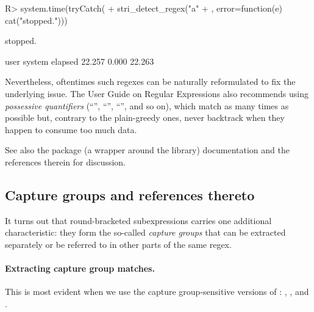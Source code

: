 \documentclass[nojss]{jss}
\begin{document}
\begin{Schunk}
\begin{Sinput}
R> system.time(tryCatch({
+      stri_detect_regex("a" %s*% 1000 %s+% "c", "(a+)+b", time_limit=1e5)
+  }, error=function(e) cat("stopped.")))
\end{Sinput}
\begin{Soutput}
stopped.
\end{Soutput}
\begin{Soutput}
   user  system elapsed
 22.257   0.000  22.263
\end{Soutput}
\end{Schunk}


Nevertheless, oftentimes such regexes can be naturally
reformulated to  fix the underlying issue.
The  User Guide on Regular Expressions also recommends using
\textit{possessive quantifiers} (``'', ``\code{*+}'', ``\code{++}'', and so on),
which match as many times as possible but, contrary to
the plain-greedy ones, never backtrack when they happen to consume too much data.

See also the  package (a wrapper around the  library)
documentation and the references therein for discussion.





\subsection{Capture groups and references thereto}\label{Sec:Capturing}

It turns out that round-bracketed subexpressions carries one additional
characteristic: they form the so-called \textit{capture groups} that can
be extracted separately or be referred to in other parts of the same regex.


\paragraph{Extracting capture group matches.}
This is most evident when we use the
capture group-sensitive versions of :
,
, and
.
\end{document}
